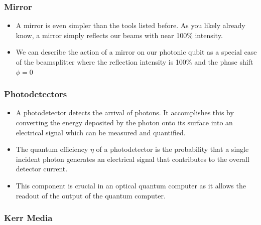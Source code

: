 \subsubsection{Mirror}
\begin{itemize}
    \item A mirror is even simpler than the tools listed before. As you likely already know, a mirror simply reflects our beams with near 100\% intensity.
    \item We can describe the action of a mirror on our photonic qubit as a special case of the beamsplitter where the reflection intensity is 100\% and the phase shift $\phi = 0$
\end{itemize}
\subsubsection{Photodetectors}
\begin{itemize}
    \item A photodetector detects the arrival of photons. It accomplishes this by converting the energy deposited by the photon onto its surface into an electrical signal which can be measured and quantified.
    
    \item The quantum efficiency $\eta$ of a photodetector is the probability that a single incident photon generates an electrical signal that contributes to the overall detector current.
    
    \item This component is crucial in an optical quantum computer as it allows the readout of the output of the quantum computer.
\end{itemize}
\subsubsection{Kerr Media}


